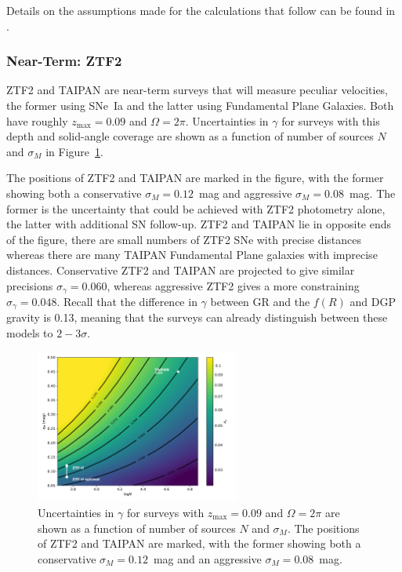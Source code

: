 \documentclass[11pt, oneside]{article}   	%
\begin{document}
Details on the assumptions made for the calculations that follow can be found in \citet{2019BAAS...51c.140K}.

\subsubsection{Near-Term: ZTF2}
ZTF2 and TAIPAN are near-term surveys that will measure peculiar velocities, the former using SNe~Ia and the latter
using Fundamental Plane Galaxies.  Both have roughly
 $z_{\text{max}}=0.09$ and $\Omega = 2\pi$.
Uncertainties in $\gamma$ for surveys with this depth and solid-angle coverage 
are shown as a function of number of sources $N$ and $\sigma_M$ in Figure~\ref{surface:fig}. 

The positions of ZTF2 and TAIPAN are marked
in the figure, with the former showing both  a conservative $\sigma_M=0.12$~mag and aggressive $\sigma_M=0.08$~mag.
The former is the uncertainty that could be achieved with ZTF2 photometry alone, the latter with additional
SN follow-up.
ZTF2 and TAIPAN lie in opposite ends of the figure, there are small numbers of ZTF2 SNe with precise distances
whereas there are many TAIPAN Fundamental Plane galaxies with imprecise distances. 
Conservative ZTF2 and TAIPAN
are projected to give similar precisions $\sigma_ \gamma = 0.060$, whereas  aggressive ZTF2 gives a more constraining
$\sigma_ \gamma = 0.048$.  
Recall that the difference in $\gamma$  between GR and the $f(R)$ and DGP gravity is 0.13, meaning that the surveys
can already distinguish between these models to $2-3 \sigma$.

\begin{figure}
\centering
\includegraphics[width=0.6\textwidth]{src/surface1.pdf}
\caption{Uncertainties in $\gamma$ for surveys  with $z_{\text{max}}=0.09$ and $\Omega = 2\pi$
are shown as a function of number of sources $N$ and $\sigma_M$.  The positions of ZTF2 and TAIPAN are marked,
with the former showing both  a conservative $\sigma_M=0.12$~mag and an aggressive $\sigma_M=0.08$~mag.
\label{surface:fig}}
\end{figure}
\end{document}
